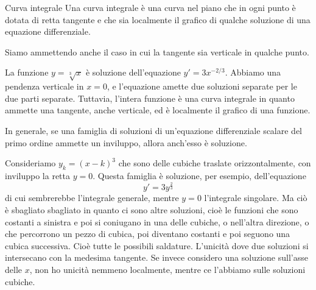 \documentclass[a4paper]{article}
\begin{document}
\begin{snippetdefinition}{Curva integrale}
    Una curva integrale è una curva nel piano che in ogni punto è
    dotata di retta tangente e che sia localmente
    il grafico di qualche soluzione
    di una equazione differenziale.
\end{snippetdefinition}

Siamo ammettendo anche il caso in cui la tangente sia verticale in qualche punto.

\begin{snippetexample}{}
    La funzione \(y = \sqrt[3]{x}\)
    è soluzione dell'equazione \(y' = 3x^{-2/3}\).
    Abbiamo una pendenza verticale in \(x=0\), e l'equazione amette
    due soluzioni separate per le due parti separate.
    Tuttavia, l'intera funzione è una curva integrale in quanto ammette una tangente,
    anche verticale, ed è localmente il grafico di una funzione.
\end{snippetexample}

In generale, se una famiglia di soluzioni
di un'equazione differenziale scalare del primo ordine ammette
un inviluppo, allora anch'esso è soluzione.

\begin{snippetexample}{}
    \begin{figure}
        \begin{center}
        \end{center}
    \end{figure}
    Consideriamo \(y_k = (x-k)^3\) che sono delle cubiche traslate orizzontalmente,
    con inviluppo la retta \(y=0\).
    Questa famiglia è soluzione, per esempio, dell'equazione
    \[
        y' = 3y^{\frac23}
    \]
    di cui sembrerebbe l'integrale generale, mentre \(y=0\) l'integrale singolare.
    Ma ciò è sbagliato sbagliato in quanto ci sono altre soluzioni,
    cioè le funzioni che sono costanti a sinistra e poi si coniugano in una delle cubiche,
    o nell'altra direzione, o che percorrono un pezzo di cubica, poi diventano costanti e poi seguono una cubica successiva.
    Cioè tutte le possibili saldature.
    L'unicità dove due soluzioni si intersecano
    con la medesima tangente. Se invece considero una soluzione sull'asse delle \(x\),
    non ho unicità nemmeno localmente, mentre ce l'abbiamo sulle soluzioni cubiche.
    \wrapfill
\end{snippetexample}
\end{document}
